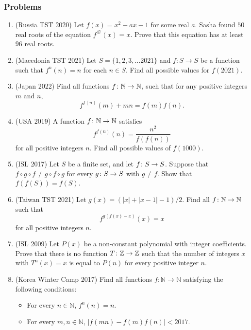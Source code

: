 \documentclass[11pt,paper=letter]{scrartcl}
\begin{document}
\subsubsection*{Problems}

\begin{enumerate}

\item (Russia TST 2020) Let $f(x) = x^2 + ax - 1$ for some real $a$. Sasha found $50$ real roots of the equation $f^{47}(x) = x$. Prove that this equation has at least $96$ real roots.
\hint{\ref{h:1}}

\item (Macedonia TST 2021) Let $S=\{1, 2, 3, \dots 2021\}$ and $f:S \to S$ be a function such that $f^{n}(n)=n$ for each $n \in S$. Find all possible values for $f(2021)$.
\hint{\ref{h:2}}

\item (Japan 2022) Find all functions $f \colon \mathbb N \to \mathbb N$, such that for any positive integers $m$ and $n$,
$$f^{f(n)}(m)+mn=f(m)f(n).$$
\hints{\ref{h:3} \ref{h:4}}

\item (USA 2019) A function $f \colon \mathbb N \to \mathbb N$ satisfies \[f^{f(n)}(n)=\frac{n^2}{f(f(n))}\]for all positive integers $n$. Find all possible values of $f(1000)$.
\hints{\ref{h:3} \ref{h:5}}

\item (ISL 2017) Let $S$ be a finite set, and let $f \colon S \to S$. Suppose that $f \circ g \circ f \ne g \circ f \circ g$ for every $g \colon S \to S$ with $g \ne f$. Show that $f(f(S)) = f(S)$.
\hints{\ref{h:27} \ref{h:28}}

\item (Taiwan TST 2021) Let $g(x) = (|x|+|x-1|-1)/2$. Find all $f \colon \mathbb N \to \mathbb N$ such that
\[f^{g(f(x)-x)}(x)=x\]
for all positive integers $n$.
\hint{\ref{h:6}}

\item (ISL 2009) Let $P(x)$ be a non-constant polynomial with integer coefficients. Prove that there is no function $T \colon \mathbb Z \to \mathbb Z$ such that the number of integers $x$ with $T^n(x)=x$ is equal to $P(n)$ for every positive integer $n$.
\hints{\ref{h:7} \ref{h:8}}

\item (Korea Winter Camp 2017) Find all functions $f : \mathbb{N} \to \mathbb{N}$ satisfying the following conditions:
\begin{itemize}
\item For every $n \in \mathbb{N}$, $f^{n}(n) = n$.
\item For every $m, n \in \mathbb{N}$, $\lvert f(mn) - f(m) f(n) \rvert < 2017$. \hints{\ref{h:9} \ref{h:3}}
\end{itemize}

\end{enumerate}
\end{document}

